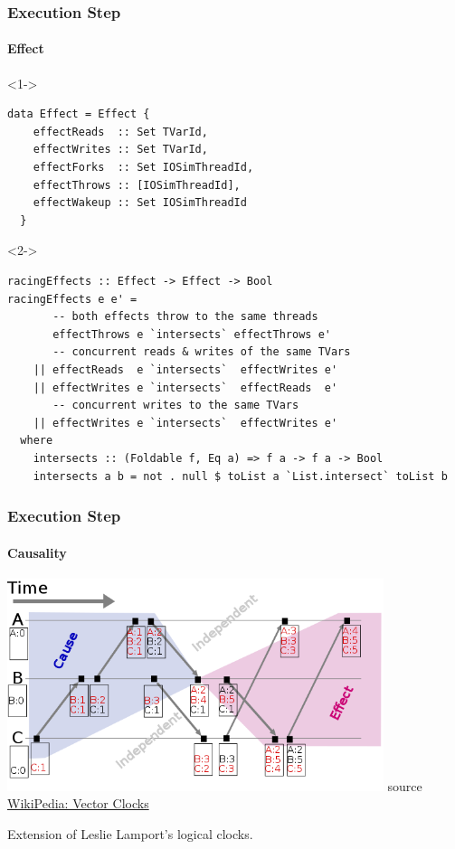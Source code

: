 \documentclass[t,x11names,xcolor={x11names},hyperref={colorlinks,citecolor=Blue4,linkcolor=Blue4,anchorcolor=Blue4,urlcolor=Blue4}]{beamer}
\begin{document}
\begin{frame}[fragile]
  \frametitle{Execution Step}
  \framesubtitle{Effect}
  \scriptsize
  \begin{onlyenv}<1->
    \begin{verbatim}
data Effect = Effect {
    effectReads  :: Set TVarId,
    effectWrites :: Set TVarId,
    effectForks  :: Set IOSimThreadId,
    effectThrows :: [IOSimThreadId],
    effectWakeup :: Set IOSimThreadId
  }
    \end{verbatim}
  \end{onlyenv}
  \begin{onlyenv}<2->
    \begin{verbatim}
racingEffects :: Effect -> Effect -> Bool
racingEffects e e' =
       -- both effects throw to the same threads
       effectThrows e `intersects` effectThrows e'
       -- concurrent reads & writes of the same TVars
    || effectReads  e `intersects`  effectWrites e'
    || effectWrites e `intersects`  effectReads  e'
       -- concurrent writes to the same TVars
    || effectWrites e `intersects`  effectWrites e'
  where
    intersects :: (Foldable f, Eq a) => f a -> f a -> Bool
    intersects a b = not . null $ toList a `List.intersect` toList b
    \end{verbatim}
  \end{onlyenv}
\end{frame}

\begin{frame}[fragile]
  \frametitle{Execution Step}
  \framesubtitle{Causality}
  \begin{center}
  \includegraphics[width=11cm]{vector-clocks.png}
  {\small source \href{https://en.wikipedia.org/wiki/Vector_clock}{WikiPedia: Vector Clocks}}\\
  \end{center}
  Extension of Leslie Lamport's logical clocks.
\end{frame}
\end{document}
